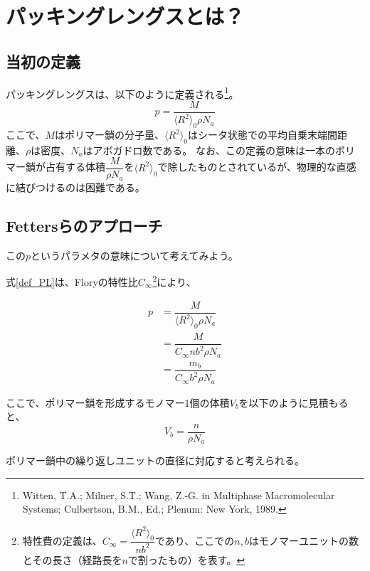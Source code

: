 \documentclass[a4paper,11pt]{ltjsarticle}
\begin{document}
\section{パッキングレングスとは？}

\subsection{当初の定義}

パッキングレングスは、以下のように定義される\footnote{
    Witten, T.A.; Milner, S.T.; Wang, Z.-G. in Multiphase Macromolecular Systems; Culbertson, B.M., Ed.; Plenum: New York, 1989.
}。
\begin{equation}
    p=\dfrac{M}{\langle R^2 \rangle_0 \rho N_a}
    \label{def_PL}
\end{equation}
ここで、$M$はポリマー鎖の分子量、$\langle R^2 \rangle_0$はシータ状態での平均自乗末端間距離、$\rho$は密度、$N_a$はアボガドロ数である。
なお、この定義の意味は一本のポリマー鎖が占有する体積$\dfrac{M}{\rho N_a}$を$\langle R^2 \rangle_0$で除したものとされているが、物理的な直感に結びつけるのは困難である。

\subsection{Fettersらのアプローチ}
この$p$というパラメタの意味について考えてみよう。

式\eqref{def_PL}は、Floryの特性比$C_{\infty}$\footnote{
特性費の定義は、$C_{\infty}=\dfrac{\langle R^2 \rangle_0}{n b^2}$であり、ここでの$n, b$はモノマーユニットの数とその長さ（経路長を$n$で割ったもの）を表す。
}により、

\begin{align}
    p&=\dfrac{M}{\langle R^2 \rangle_0 \rho N_a} \\
    &=\dfrac{M}{C_{\infty} n b^2 \rho N_a} \\
    &=\dfrac{m_b}{C_{\infty}b^2\rho N_a}
\end{align}

ここで、ポリマー鎖を形成するモノマー1個の体積$V_b$を以下のように見積もると、
\begin{equation}
    V_b=\dfrac{n}{\rho N_a}
\end{equation}







ポリマー鎖中の繰り返しユニットの直径に対応すると考えられる。
\end{document}

